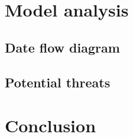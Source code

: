 \documentclass[a4paper,10pt]{report}
\begin{document}
\section{Model analysis}

\subsection{Date flow diagram}

\subsection{Potential threats}

\section{Conclusion}
\end{document}
